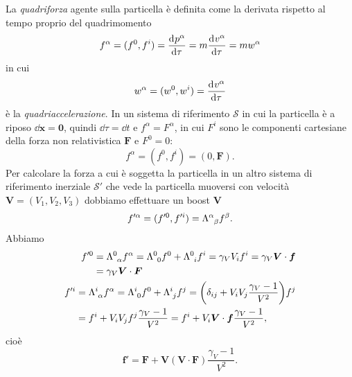 La \emph{quadriforza} agente sulla particella è definita come
la derivata rispetto al tempo proprio del quadrimomento
\begin{equation}
  f^{\alpha} = (f^{0},f^{i}) =\frac{{\mathop{}\!\mathrm{d}^{}}p^{\alpha}}{\mathop{}\!\mathrm{d} {\tau}^{}} =
  m\frac{{\mathop{}\!\mathrm{d}^{}}v^{\alpha}}{\mathop{}\!\mathrm{d} {\tau}^{}} = mw^{\alpha}
\end{equation}
in cui
\begin{equation}
  w^{\alpha} = (w^{0},w^{i}) =\frac{{\mathop{}\!\mathrm{d}^{}}v^{\alpha}}{\mathop{}\!\mathrm{d} {\tau}^{}}
\end{equation}
è la \emph{quadriaccelerazione}.  In un sistema di
riferimento $\mathcal{S}$ in cui la particella è a riposo $\dd \bm{x} = \bm{0}$,
quindi $\dd \tau = \dd t$ e $f^{\alpha} = F^{\alpha}$, in cui $F^{i}$ sono le
componenti cartesiane della forza non relativistica $\bm{F}$ e $F^{0} = 0$:
\begin{equation}
  f^{\alpha} = (f^{0}, f^{i}) = (0, \bm{F}).
\end{equation}
Per calcolare la forza a cui è soggetta la particella in un altro sistema di
riferimento inerziale $\mathcal{S}'$ che vede la particella muoversi con
velocità $\bm{V} = (V_{1}, V_{2}, V_{3})$ dobbiamo effettuare un boost $\bm{V}$
\begin{equation}
  f'^{\alpha} = (f'^{0}, f'^{i}) = \tensor{\Lambda}{^{\alpha}_{\beta}}f^{\beta}.
\end{equation}
Abbiamo
\begin{subequations}
  \begin{align}
    \begin{split}
      f'^{0} &= \tensor{\Lambda}{^{0}_{\alpha}}f^{\alpha} =
      \tensor{\Lambda}{^{0}_{0}}f^{0} + \tensor{\Lambda}{^{0}_{i}}f^{i} =
      \gamma_{V} V_{i}f^{i} = \gamma_{V} \bm{V} \cdot \bm{f} \\
      &= \gamma_{V} \bm{V} \cdot \bm{F}
    \end{split} \\
    \begin{split}
      f'^{i} &= \tensor{\Lambda}{^{i}_{\alpha}}f^{\alpha} =
      \tensor{\Lambda}{^{i}_{0}}f^{0} + \tensor{\Lambda}{^{i}_{j}}f^{j}
      = \bigg( \delta_{ij} + V_{i}V_{j}\frac{\gamma_{V} - 1}{V^{2}} \bigg)f^{j}\\
      &= f^{i} + V_{i}V_{j}f^{j}\frac{\gamma_{V} - 1}{V^{2}} = f^{i} + V_{i}
      \bm{V} \cdot \bm{f} \frac{\gamma_{V} - 1}{V^{2}},
    \end{split}
  \end{align}
\end{subequations}
cioè
\begin{equation}
  \bm{f}' = \bm{F} + \bm{V}(\bm{V}\cdot\bm{F})\frac{\gamma_{V} - 1}{V^{2}}.
\end{equation}

